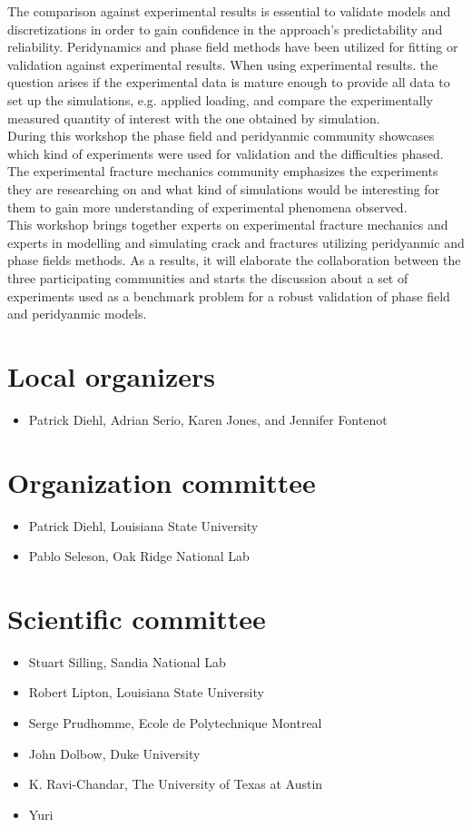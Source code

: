 The comparison against experimental results is essential to validate models and discretizations in order to gain confidence in the approach’s predictability and reliability. Peridynamics and phase field methods have been utilized for fitting or validation against experimental results. When using experimental results. the question arises if the experimental data is mature enough to provide all data to set up the simulations, e.g. applied loading, and compare the experimentally measured quantity of interest with the one obtained by simulation. \\

During this workshop the phase field and peridyanmic community showcases which kind of experiments were used for validation and the difficulties phased. The experimental fracture mechanics community emphasizes the experiments they are researching on and what kind of simulations would be interesting for them to gain more understanding of experimental phenomena observed. \\

This workshop brings together experts on experimental fracture mechanics and experts in modelling and simulating crack and fractures utilizing peridyanmic and phase fields methods. As a results, it will elaborate the collaboration between the three participating communities and starts the discussion about a set of experiments used as a benchmark problem for a robust validation of phase field and peridyanmic models.




\section*{Local organizers}
\begin{itemize}
    \item Patrick Diehl, Adrian Serio, Karen Jones, and Jennifer Fontenot 
\end{itemize}

\section*{Organization committee }
\begin{itemize}
\item Patrick Diehl, Louisiana State University
\item Pablo Seleson, Oak Ridge National Lab
\end{itemize}

\section*{Scientific committee}
\begin{itemize}
\item Stuart Silling, Sandia National Lab
\item Robert Lipton, Louisiana State University
\item Serge Prudhomme, Ecole de Polytechnique Montreal
\item John Dolbow, Duke University
\item K. Ravi-Chandar, The University of Texas at Austin
\item Yuri
\end{itemize}
